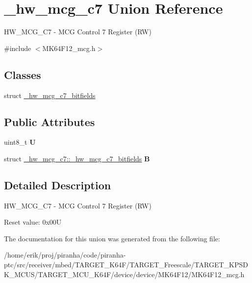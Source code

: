 \hypertarget{union__hw__mcg__c7}{}\section{\+\_\+hw\+\_\+mcg\+\_\+c7 Union Reference}
\label{union__hw__mcg__c7}


H\+W\+\_\+\+M\+C\+G\+\_\+\+C7 -\/ M\+CG Control 7 Register (RW)  




{\ttfamily \#include $<$M\+K64\+F12\+\_\+mcg.\+h$>$}

\subsection*{Classes}
\begin{DoxyCompactItemize}
\item 
struct \hyperlink{struct__hw__mcg__c7_1_1__hw__mcg__c7__bitfields}{\+\_\+hw\+\_\+mcg\+\_\+c7\+\_\+bitfields}
\end{DoxyCompactItemize}
\subsection*{Public Attributes}
\begin{DoxyCompactItemize}
\item 
uint8\+\_\+t {\bfseries U}\hypertarget{union__hw__mcg__c7_ab0ddb6d43615774105abb9615af320b7}{}\label{union__hw__mcg__c7_ab0ddb6d43615774105abb9615af320b7}

\item 
struct \hyperlink{struct__hw__mcg__c7_1_1__hw__mcg__c7__bitfields}{\+\_\+hw\+\_\+mcg\+\_\+c7\+::\+\_\+hw\+\_\+mcg\+\_\+c7\+\_\+bitfields} {\bfseries B}\hypertarget{union__hw__mcg__c7_ac388438625b9b45551eca2bab0d6cb97}{}\label{union__hw__mcg__c7_ac388438625b9b45551eca2bab0d6cb97}

\end{DoxyCompactItemize}


\subsection{Detailed Description}
H\+W\+\_\+\+M\+C\+G\+\_\+\+C7 -\/ M\+CG Control 7 Register (RW) 

Reset value\+: 0x00U 

The documentation for this union was generated from the following file\+:\begin{DoxyCompactItemize}
\item 
/home/erik/proj/piranha/code/piranha-\/ptc/src/receiver/mbed/\+T\+A\+R\+G\+E\+T\+\_\+\+K64\+F/\+T\+A\+R\+G\+E\+T\+\_\+\+Freescale/\+T\+A\+R\+G\+E\+T\+\_\+\+K\+P\+S\+D\+K\+\_\+\+M\+C\+U\+S/\+T\+A\+R\+G\+E\+T\+\_\+\+M\+C\+U\+\_\+\+K64\+F/device/device/\+M\+K64\+F12/M\+K64\+F12\+\_\+mcg.\+h\end{DoxyCompactItemize}
